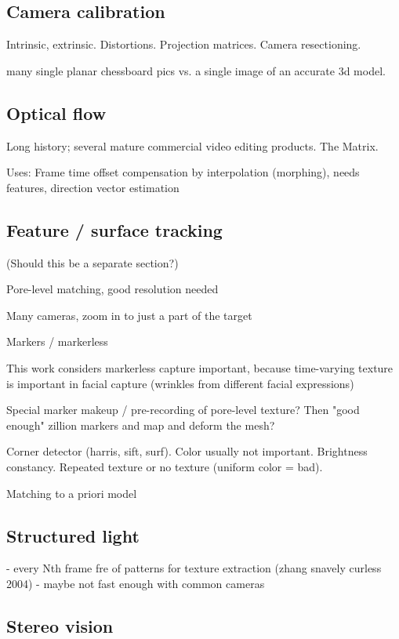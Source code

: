 \subsection{Camera calibration}

Intrinsic, extrinsic. Distortions. Projection matrices. Camera resectioning.

many single planar chessboard pics vs. a single image of an accurate 3d model.


\subsection{Optical flow}

Long history; several mature commercial video editing products. The Matrix.

Uses: Frame time offset compensation by interpolation (morphing), needs features, direction vector estimation

\subsection{Feature / surface tracking}

(Should this be a separate section?)

Pore-level matching, good resolution needed

Many cameras, zoom in to just a part of the target

Markers / markerless

This work considers markerless capture important, because time-varying texture is important in facial capture (wrinkles from different facial expressions)

Special marker makeup / pre-recording of pore-level texture? Then "good enough" zillion markers and map and deform the mesh?

Corner detector (harris, sift, surf). Color usually not important. Brightness constancy. Repeated texture or no texture (uniform color = bad).

Matching to a priori model


\subsection{Structured light}

- every Nth frame fre of patterns for texture extraction (zhang snavely curless 2004)
- maybe not fast enough with common cameras

\subsection{Stereo vision}

